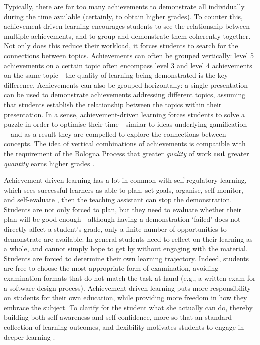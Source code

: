 \documentclass[sigconf]{acmart}
\begin{document}
Typically, there are far too many achievements to demonstrate all
individually during the time available (certainly, to obtain higher
grades). To counter this, achievement-driven learning encourages
students to see the relationship between multiple achievements, and to
group and demonstrate them coherently together. Not only does this
reduce their workload, it forces students to search for the connections
between topics. Achievements can often be grouped vertically: level 5
achievements on a certain topic often encompass level 3 and level 4
achievements on the same topic---the quality of learning being
demonstrated is the key difference. Achievements can also be grouped
horizontally: a single presentation can be used to demonstrate
achievements addressing different topics, assuming that students
establish the relationship between the topics within their presentation.
In a sense, achievement-driven learning forces students to solve a
puzzle in order to optimise their time---similar to ideas underlying
gamification \citep{leeHammer2011}---and as a result they are compelled
to explore the connections between concepts. The idea of vertical
combinations of achievements is compatible with the requirement of the
Bologna Process that greater \textit{quality} of work \textbf{not}
greater \textit{quantity} earns higher grades
\citep{bolognaDeclaration}.

Achievement-driven learning has a lot in common with self-regulatory
learning, which sees successful learners as able to plan, set goals,
organise, self-monitor, and self-evaluate \citep{zimmerman1986}, then
the teaching assistant can stop the demonstration. Students are not only
forced to plan, but they need to evaluate whether their plan will be
good enough---although having a demonstration `failed' does not directly
affect a student's grade, only a finite number of opportunities to
demonstrate are available. In general students need to reflect on their
learning as a whole, and cannot simply hope to get by without engaging
with the material. Students are forced to determine their own learning
trajectory. Indeed, students are free to choose the most appropriate
form of examination, avoiding examination formats that do not match the
task at hand (e.g., a written exam for a software design process).
Achievement-driven learning puts more responsibility on students for
their own education, while providing more freedom in how they embrace
the subject. To clarify for the student what she actually can do,
thereby building both self-awareness and self-confidence, more so that
an standard collection of learning outcomes, and flexibility motivates
students to engage in deeper learning \citep{biggsTang2011}.
\end{document}
